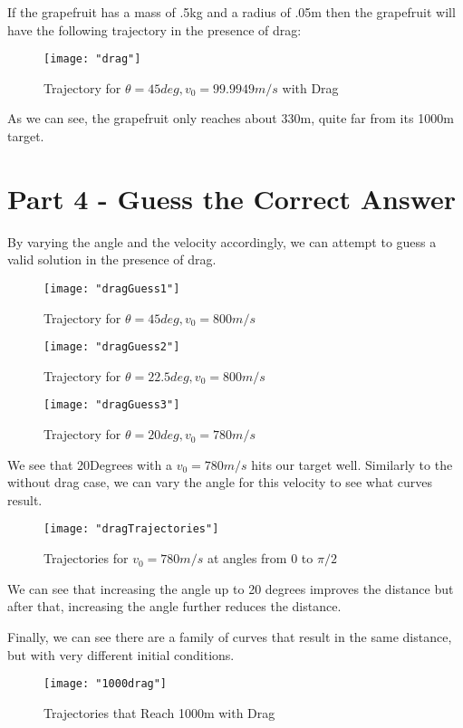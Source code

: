 \documentclass{article}
\begin{document}
If the grapefruit has a mass of .5kg and a radius of .05m then the grapefruit will have the following trajectory in the presence of drag:

\begin{figure}[h!]
	\centering
	\texttt{[image: "drag"]}
	\caption{Trajectory for $\theta = 45deg, v_0 = 99.9949m/s$ with Drag}
\end{figure} 
\FloatBarrier

As we can see, the grapefruit only reaches about 330m, quite far from its 1000m target.

\section{Part 4 - Guess the Correct Answer}
By varying the angle and the velocity accordingly, we can attempt to guess a valid solution in the presence of drag.
\begin{figure}[h!]
	\centering
	\texttt{[image: "dragGuess1"]}
	\caption{Trajectory for $\theta = 45deg, v_0 = 800m/s$}
\end{figure} 
\begin{figure}[h!]
	\centering
	\texttt{[image: "dragGuess2"]}
	\caption{Trajectory for $\theta = 22.5deg, v_0 = 800m/s$}
\end{figure} 
\begin{figure}[h!]
	\centering
	\texttt{[image: "dragGuess3"]}
	\caption{Trajectory for $\theta = 20deg, v_0 = 780m/s$}
\end{figure} 
\FloatBarrier

We see that 20Degrees with a $v_0 = 780m/s$ hits our target well. Similarly to the without drag case, we can vary the angle for this velocity
to see what curves result. 

\begin{figure}[h!]
	\centering
	\texttt{[image: "dragTrajectories"]}
	\caption{Trajectories for  $v_0 = 780m/s$ at angles from 0 to $\pi/2$}
\end{figure} 
\FloatBarrier

We can see that increasing the angle up to 20 degrees improves the distance but after that, increasing the angle further reduces the distance.

Finally, we can see there are a family of curves that result in the same distance, but with very different initial conditions.

\begin{figure}[h!]
	\centering
	\texttt{[image: "1000drag"]}
	\caption{Trajectories that Reach 1000m with Drag}
\end{figure} 
\FloatBarrier
\end{document}
